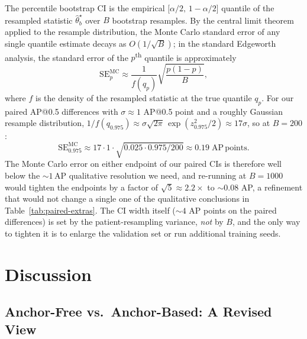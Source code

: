 \documentclass[11pt,a4paper]{article}
\begin{document}
The percentile bootstrap CI is the empirical $\bigl[\alpha/2,\,1 - \alpha/2\bigr]$ quantile of the resampled statistic $\hat\theta^{\star}_b$ over $B$ bootstrap resamples. By the central limit theorem applied to the resample distribution, the Monte Carlo standard error of any single quantile estimate decays as $O(1/\sqrt B)$; in the standard Edgeworth analysis, the standard error of the $p$\textsuperscript{th} quantile is approximately
\begin{equation}
\mathrm{SE}_{p}^{\mathrm{MC}} \approx \frac{1}{f(q_p)}\sqrt{\frac{p(1 - p)}{B}},
\end{equation}
where $f$ is the density of the resampled statistic at the true quantile $q_p$. For our paired AP@0.5 differences with $\sigma \approx 1$ AP@0.5 point and a roughly Gaussian resample distribution, $1/f(q_{0.975}) \approx \sigma\sqrt{2\pi}\,\exp(z_{0.975}^2/2) \approx 17 \sigma$, so at $B = 200$:
\begin{equation}
\mathrm{SE}_{0.975}^{\mathrm{MC}} \approx 17 \cdot 1 \cdot \sqrt{0.025 \cdot 0.975 / 200} \approx 0.19\;\mathrm{AP\,points}.
\end{equation}
The Monte Carlo error on either endpoint of our paired CIs is therefore well below the $\sim 1$\,AP qualitative resolution we need, and re-running at $B = 1000$ would tighten the endpoints by a factor of $\sqrt 5 \approx 2.2\times$ to $\sim 0.08$ AP, a refinement that would not change a single one of the qualitative conclusions in Table~\ref{tab:paired-extras}. The CI width itself ($\sim 4$ AP points on the paired differences) is set by the patient-resampling variance, \emph{not} by $B$, and the only way to tighten it is to enlarge the validation set or run additional training seeds.

\pagebreak

\section{Discussion}
\label{sec:discussion}

\subsection{Anchor-Free vs.\ Anchor-Based: A Revised View}
\end{document}
